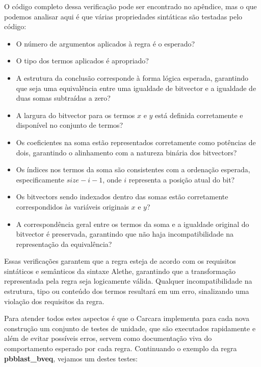 \documentclass[conference]{IEEEtran}
\begin{document}
O código completo dessa verificação pode ser encontrado no apêndice, mas o que podemos
analisar aqui é que várias propriedades sintáticas são testadas pelo código:
\begin{itemize}
    \item O número de argumentos aplicados à regra é o esperado?
    \item O tipo dos termos aplicados é apropriado?
    \item A estrutura da conclusão corresponde à forma lógica esperada, garantindo que seja uma equivalência entre uma igualdade de bitvector e a igualdade de duas somas subtraídas a zero?
    \item A largura do bitvector para os termos $x$ e $y$ está definida corretamente e disponível no conjunto de termos?
    \item Os coeficientes na soma estão representados corretamente como potências de dois, garantindo o alinhamento com a natureza binária dos bitvectors?
    \item Os índices nos termos da soma são consistentes com a ordenação esperada, especificamente $size - i - 1$, onde $i$ representa a posição atual do bit?
    \item Os bitvectors sendo indexados dentro das somas estão corretamente correspondidos às variáveis originais $x$ e $y$?
    \item A correspondência geral entre os termos da soma e a igualdade original do bitvector é preservada, garantindo que não haja incompatibilidade na representação da equivalência?
\end{itemize}

Essas verificações garantem que a regra esteja de acordo com os requisitos sintáticos e
semânticos da sintaxe Alethe, garantindo que a transformação representada pela regra
seja logicamente válida. Qualquer incompatibilidade na estrutura, tipo ou conteúdo
dos termos resultará em um erro, sinalizando uma violação dos requisitos da regra.

Para atender todos estes aspectos é que o Carcara implementa para cada nova construção um
conjunto de testes de unidade, que são executados rapidamente e além de evitar possíveis erros,
servem como documentação viva do comportamento esperado por cada regra. Continuando o exemplo
da regra \textbf{pbblast\_bveq}, vejamos um destes testes:
\end{document}

